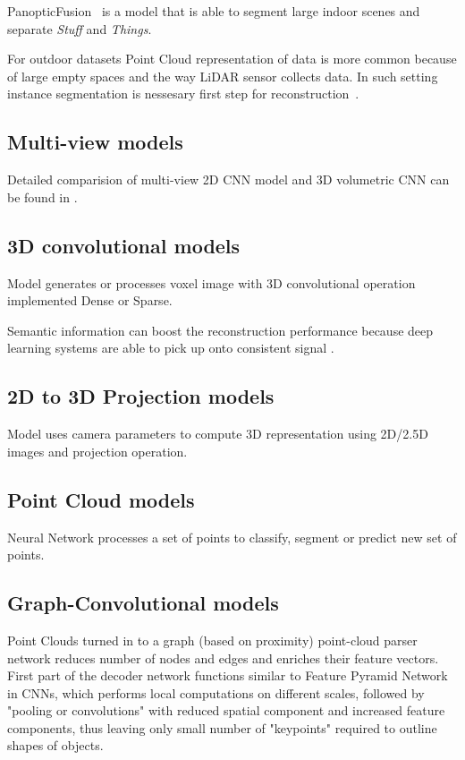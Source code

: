 PanopticFusion~\cite{narita2019panopticfusion} is a model that is able to segment large indoor scenes and separate \textit{Stuff} and \textit{Things}.


For outdoor datasets Point Cloud representation of data is more common because of large empty spaces and the way LiDAR sensor collects data. In such setting instance segmentation is nessesary first step for reconstruction~\cite{zhang2020instance}.

\subsection{Multi-view models}

Detailed comparision of multi-view 2D CNN model and 3D volumetric CNN can be found in \cite{qi2016volumetric}.
\subsection{3D convolutional models}

Model generates or processes voxel image with 3D convolutional operation implemented Dense or Sparse.

Semantic information can boost the reconstruction performance because deep learning systems are able to pick up onto consistent signal \cite{jiao2018look,tatarchenko2019single,kendall2018multi}.

\subsection{2D to 3D Projection models}

Model uses camera parameters to compute 3D representation using 2D/2.5D images and projection operation.

\subsection{Point Cloud models}

Neural Network processes a set of points to classify, segment or predict new set of points.

\subsection{Graph-Convolutional models}

Point Clouds turned in to a graph (based on proximity) point-cloud parser network reduces number of nodes and edges and enriches their feature vectors. First part of the decoder network functions similar to Feature Pyramid Network in CNNs, which performs local computations on different scales, followed by "pooling or convolutions" with reduced spatial component and increased feature components, thus leaving only small number of "keypoints" required to outline shapes of objects.


